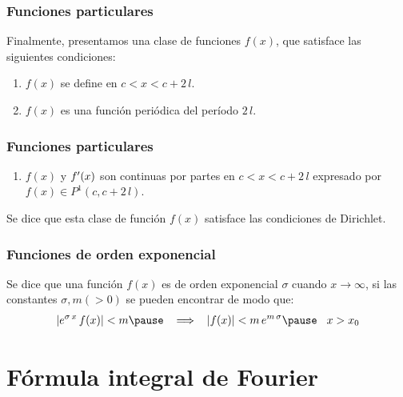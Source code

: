 \documentclass[12pt]{beamer}
\begin{document}
\begin{frame}
\frametitle{Funciones particulares}
Finalmente, presentamos una clase de funciones $f (x)$, que satisface las siguientes condiciones:
\pause
{}
\begin{enumerate}[<+->]
\item $f (x)$ se define en $c < x < c + 2 \, l$.
\item $f (x)$ es una función periódica del período $2 \, l$.
\seti
\end{enumerate}
\end{frame}
\begin{frame}
\frametitle{Funciones particulares}
\begin{enumerate}[<+->]
\conti
\item $f (x)$ y ${f}^{\prime} (x)$ son continuas por partes en $c  < x <c + 2 \, l$ expresado por $f (x) \in P^{1} (c, c + 2 \, l)$.
\end{enumerate}
\pause
Se dice que esta clase de función $f (x)$ satisface las condiciones de Dirichlet. 
\end{frame}
\begin{frame}
\frametitle{Funciones de orden exponencial}
Se dice que una función $f (x)$ es de orden exponencial $\sigma$ cuando $x \to \infty$, si las constantes $\sigma, m (> 0)$ se pueden encontrar de modo que:
\pause
\begin{eqnarray*}
\begin{aligned}
\abs{ e^{\sigma \, x} \, f (x)} < m \pause \hspace{0.3cm} \Longrightarrow \hspace{0.3cm} \abs{f (x)} < m \, e^{m \, \sigma} \pause \hspace{0.3cm} x > x_{0}
\end{aligned}
\end{eqnarray*}
\end{frame}



\section{Fórmula integral de Fourier}
\end{document}
